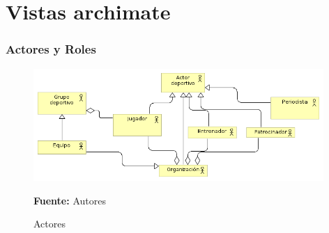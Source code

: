 \section{Vistas archimate}

\subsubsection{Actores y Roles}

\begin{figure}[!htb]
  \begin{center}
    \includegraphics[width=11cm]{./imagenes/actores.png}
    \caption{Actores}
    \label{fig:Actores}
    \textbf{Fuente:}  Autores
  \end{center}
\end{figure}

